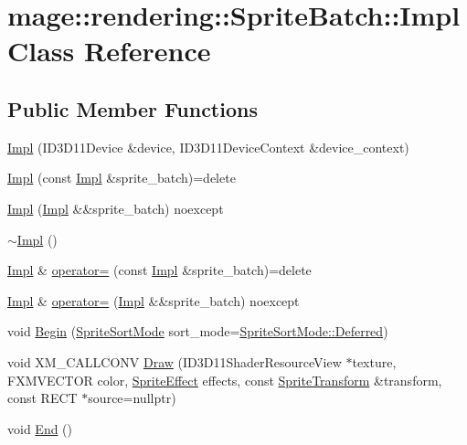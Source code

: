 \hypertarget{classmage_1_1rendering_1_1_sprite_batch_1_1_impl}{}\section{mage\+:\+:rendering\+:\+:Sprite\+Batch\+:\+:Impl Class Reference}
\label{classmage_1_1rendering_1_1_sprite_batch_1_1_impl}
\subsection*{Public Member Functions}
\begin{DoxyCompactItemize}
\item 
\hyperlink{classmage_1_1rendering_1_1_sprite_batch_1_1_impl_a47a62c120c2de8cb56eba5fb0ca8939f}{Impl} (I\+D3\+D11\+Device \&device, I\+D3\+D11\+Device\+Context \&device\+\_\+context)
\item 
\hyperlink{classmage_1_1rendering_1_1_sprite_batch_1_1_impl_aad1ca6d0f48c541dceb5f428d89be10b}{Impl} (const \hyperlink{classmage_1_1rendering_1_1_sprite_batch_1_1_impl}{Impl} \&sprite\+\_\+batch)=delete
\item 
\hyperlink{classmage_1_1rendering_1_1_sprite_batch_1_1_impl_a0f9d79fb3a897c1365f5e15a1eaf01f9}{Impl} (\hyperlink{classmage_1_1rendering_1_1_sprite_batch_1_1_impl}{Impl} \&\&sprite\+\_\+batch) noexcept
\item 
\hyperlink{classmage_1_1rendering_1_1_sprite_batch_1_1_impl_a32ea1f2a4d1f11c19594e1d4eaa36f6c}{$\sim$\+Impl} ()
\item 
\hyperlink{classmage_1_1rendering_1_1_sprite_batch_1_1_impl}{Impl} \& \hyperlink{classmage_1_1rendering_1_1_sprite_batch_1_1_impl_abcbbd766f6b1355e5d015cbdcaacfc07}{operator=} (const \hyperlink{classmage_1_1rendering_1_1_sprite_batch_1_1_impl}{Impl} \&sprite\+\_\+batch)=delete
\item 
\hyperlink{classmage_1_1rendering_1_1_sprite_batch_1_1_impl}{Impl} \& \hyperlink{classmage_1_1rendering_1_1_sprite_batch_1_1_impl_a46daa28e38d091e3d9050dca282b90aa}{operator=} (\hyperlink{classmage_1_1rendering_1_1_sprite_batch_1_1_impl}{Impl} \&\&sprite\+\_\+batch) noexcept
\item 
void \hyperlink{classmage_1_1rendering_1_1_sprite_batch_1_1_impl_a4a7442fe888c97768a427fc35448e1d1}{Begin} (\hyperlink{namespacemage_1_1rendering_a4fad00dbca0c8d854c765ab831c76055}{Sprite\+Sort\+Mode} sort\+\_\+mode=\hyperlink{namespacemage_1_1rendering_aeb14ce7610cc9391f4e01be027b91dcca4ed71db54748b36eeb398876b0c747ac}{Sprite\+Sort\+Mode\+::\+Deferred})
\item 
void X\+M\+\_\+\+C\+A\+L\+L\+C\+O\+NV \hyperlink{classmage_1_1rendering_1_1_sprite_batch_1_1_impl_a62585b07c1b2ede917ad49c0cfda57f1}{Draw} (I\+D3\+D11\+Shader\+Resource\+View $\ast$texture, F\+X\+M\+V\+E\+C\+T\+OR color, \hyperlink{namespacemage_1_1rendering_a4dbc3536c87b906f1d41d863ec458e78}{Sprite\+Effect} effects, const \hyperlink{classmage_1_1_sprite_transform}{Sprite\+Transform} \&transform, const R\+E\+CT $\ast$source=nullptr)
\item 
void \hyperlink{classmage_1_1rendering_1_1_sprite_batch_1_1_impl_a46d4871b99ac78e00f703ca4297e67f3}{End} ()
\end{DoxyCompactItemize}
